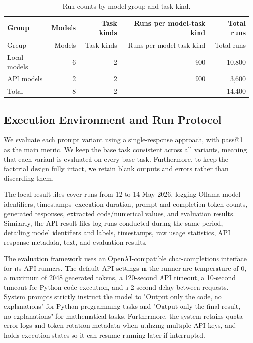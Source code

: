 \documentclass{llncs}
\begin{document}
\begin{longtable}[]{@{}lrrrr@{}}
\caption{Run counts by model group and task kind.}\tabularnewline
\toprule\noalign{}
Group & Models & Task kinds & Runs per model-task kind & Total runs \\
\midrule\noalign{}
\endfirsthead
\toprule\noalign{}
Group & Models & Task kinds & Runs per model-task kind & Total runs \\
\midrule\noalign{}
\endhead
\bottomrule\noalign{}
\endlastfoot
Local models & 6 & 2 & 900 & 10,800 \\
API models & 2 & 2 & 900 & 3,600 \\
Total & 8 & 2 & - & 14,400 \\
\end{longtable}


\subsection{Execution Environment and Run Protocol}\label{execution-environment-and-run-protocol}

We evaluate each prompt variant using a single-response approach, with pass@1 as the main metric. We keep the base task consistent across all variants, meaning that each variant is evaluated on every base task. Furthermore, to keep the factorial design fully intact, we retain blank outputs and errors rather than discarding them.

The local result files cover runs from 12 to 14 May 2026, logging Ollama model identifiers, timestamps, execution duration, prompt and completion token counts, generated responses, extracted code/numerical values, and evaluation results. Similarly, the API result files log runs conducted during the same period, detailing model identifiers and labels, timestamps, raw usage statistics, API response metadata, text, and evaluation results.

The evaluation framework uses an OpenAI-compatible chat-completions interface for its API runners. The
default API settings in the runner are temperature of 0, a maximum of 2048 generated tokens, a 120-second API timeout, a 10-second timeout for Python code execution, and a 2-second delay between requests. System prompts strictly instruct the model to "Output only the code, no explanations" for Python programming tasks and "Output only the final result, no explanations" for mathematical tasks. Furthermore, the system retains quota error logs and token-rotation metadata when utilizing multiple API keys, and holds execution states so it can resume running later if interrupted.
\end{document}
